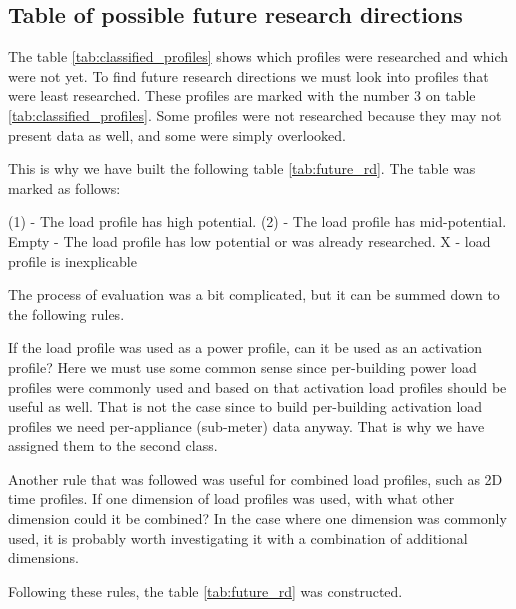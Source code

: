 \subsection{Table of possible future research directions}

The table \ref{tab:classified_profiles} shows which profiles were researched and which were not yet.
To find future research directions we must look into profiles that were least researched.
These profiles are marked with the number 3 on table \ref{tab:classified_profiles}.
Some profiles were not researched because they may not present data as well,
and some were simply overlooked. 

This is why we have built the following table \ref{tab:future_rd}.
The table was marked as follows:

\begin{outline} 
\1 (1) - The load profile has high potential. 
\1 (2) - The load profile has mid-potential.
\1 Empty - The load profile has low potential or was already researched.
\1 X - load profile is inexplicable
\end{outline}

The process of evaluation was a bit complicated, but it can be summed down to the following rules.

If the load profile was used as a power profile, can it be used as an activation profile?
Here we must use some common sense since per-building power load profiles were commonly used and based on that activation load profiles should be useful as well.
That is not the case since to build per-building activation load profiles we need per-appliance (sub-meter) data anyway. That is why we have assigned them to the second class.

Another rule that was followed was useful for combined load profiles, such as 2D time profiles. 
If one dimension of load profiles was used, with what other dimension could it be combined?
In the case where one dimension was commonly used, it is probably worth investigating it with a combination of additional dimensions. 

Following these rules, the table  \ref{tab:future_rd} was constructed.


